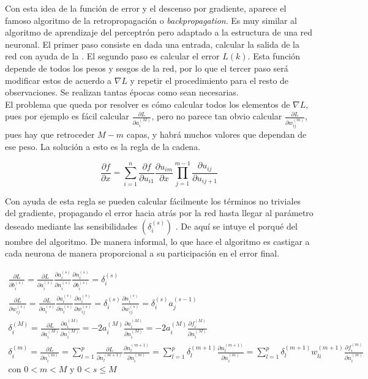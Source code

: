 		Con esta idea de la función de error y el descenso por gradiente, aparece el famoso algoritmo de la retropropagación o \textit{backpropagation}. Es muy similar al algoritmo de aprendizaje del perceptrón pero adaptado a la estructura de una red neuronal. El primer paso consiste en dada una entrada, calcular la salida de la red con ayuda de la . El segundo paso es calcular el error $L(k)$. Esta función depende de todos los pesos y sesgos de la red, por lo que el tercer paso será modificar estos de acuerdo a $\nabla L$ y repetir el procedimiento para el resto de observaciones. Se realizan tantas épocas como sean necesarias. \\
		
		El problema que queda por resolver es cómo calcular todos los elementos de $\nabla L$, pues por ejemplo es fácil calcular $\frac{\partial L}{\partial a_i^{(M)}}$, pero no parece tan obvio calcular $\frac{\partial L}{\partial w_{ij}^{(m)}}$, pues hay que retroceder $M-m$ capas, y habrá muchos valores que dependan de ese peso. La solución a esto es la regla de la cadena. 
		
		$$
		\frac{\partial f}{\partial x} = \sum_{i=1}^n \frac{\partial f}{\partial u_{i1}}\frac{\partial u_{im}}{\partial x}\prod_{j=1}^{m-1}\frac{\partial u_{ij}}{\partial u_{ij+1}}
		$$
		
		Con ayuda de esta regla se pueden calcular fácilmente los términos no triviales del gradiente, propagando el error hacia atrás por la red hasta llegar al parámetro deseado mediante las sensibilidades $\left(\delta_i^{(s)}\right)$ \cite{nndesign}. De aquí se intuye el porqué del nombre del algoritmo. De manera informal, lo que hace el algoritmo es castigar a cada neurona de manera proporcional a su participación en el error final. 
		
		$$
		\begin{gathered}
			\frac{\partial L}{\partial b_{i}^{(s)}} = \frac{\partial L}{\partial a_{i}^{(s)}} \frac{\partial a_{i}^{(s)}}{\partial n_{i}^{(s)}} \frac{\partial n_{i}^{(s)}}{\partial b_{i}^{(s)}} = \delta_i^{(s)}\\
			\frac{\partial L}{\partial w_{ij}^{(s)}} = \frac{\partial L}{\partial a_{i}^{(s)}} \frac{\partial a_{i}^{(s)}}{\partial n_{i}^{(s)}} \frac{\partial n_{i}^{(s)}}{\partial w_{ij}^{(s)}} = \delta_i^{(s)} \frac{\partial n_{i}^{(s)}}{\partial w_{ij}^{(s)}} = \delta_i^{(s)} a_j^{(s-1)}\\
			\delta_i^{(M)} = \frac{\partial L}{\partial a_{i}^{(M)}} \frac{\partial a_{i}^{(M)}}{\partial n_{i}^{(M)}} = -2a_{i}^{(M)} \frac{\partial a_{i}^{(M)}}{\partial n_{i}^{(M)}} = -2a_{i}^{(M)} \frac{\partial f_{i}^{(M)}}{\partial n_{i}^{(M)}}\\
			\delta_i^{(m)} = \frac{\partial L}{\partial n_i^{(m)}} = \sum_{l=1}^p\frac{\partial L}{\partial n_l^{(m+1)}}\frac{\partial n_l^{(m+1)}}{\partial n_i^{(m)}} = \sum_{l=1}^p \delta_l^{(m+1)} \frac{\partial n_l^{(m+1)}}{\partial n_i^{(m)}} = \sum_{l=1}^p \delta_l^{(m+1)} w_{li}^{(m+1)} \frac{\partial f_i^{(m)}}{\partial n_i^{(m)}}\\
			\text{con } 0 < m < M \text{ y } 0 < s \leq M
		\end{gathered}
		$$
		
